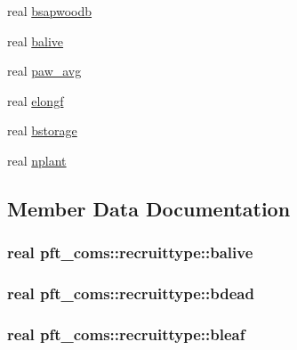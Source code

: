 \begin{DoxyCompactItemize}
\item 
real \hyperlink{structpft__coms_1_1recruittype_aa212a897e4e1741b1f0bbcc35a34a1bd}{bsapwoodb}
\item 
real \hyperlink{structpft__coms_1_1recruittype_ad4aba73ec3b526ea8c0e2ee5641cb988}{balive}
\item 
real \hyperlink{structpft__coms_1_1recruittype_a8c5c9e4dd1c79535ab5b03e8b5a5a981}{paw\+\_\+avg}
\item 
real \hyperlink{structpft__coms_1_1recruittype_ac83204f451c9483aa4a078453970602e}{elongf}
\item 
real \hyperlink{structpft__coms_1_1recruittype_af49417a4c10681ac32f8e4f0ee7a52b5}{bstorage}
\item 
real \hyperlink{structpft__coms_1_1recruittype_af6c130e8404bba50cc5d84f9d0619665}{nplant}
\end{DoxyCompactItemize}


\subsection{Member Data Documentation}
\subsubsection[{\texorpdfstring{balive}{balive}}]{\setlength{\rightskip}{0pt plus 5cm}real pft\+\_\+coms\+::recruittype\+::balive}\hypertarget{structpft__coms_1_1recruittype_ad4aba73ec3b526ea8c0e2ee5641cb988}{}\label{structpft__coms_1_1recruittype_ad4aba73ec3b526ea8c0e2ee5641cb988}
\subsubsection[{\texorpdfstring{bdead}{bdead}}]{\setlength{\rightskip}{0pt plus 5cm}real pft\+\_\+coms\+::recruittype\+::bdead}\hypertarget{structpft__coms_1_1recruittype_adbd20b6840a8ccdd160cd2ccea8dcca1}{}\label{structpft__coms_1_1recruittype_adbd20b6840a8ccdd160cd2ccea8dcca1}
\subsubsection[{\texorpdfstring{bleaf}{bleaf}}]{\setlength{\rightskip}{0pt plus 5cm}real pft\+\_\+coms\+::recruittype\+::bleaf}\hypertarget{structpft__coms_1_1recruittype_a9ad80c7a2b183b1bd3c799425f5641d0}{}\label{structpft__coms_1_1recruittype_a9ad80c7a2b183b1bd3c799425f5641d0}
